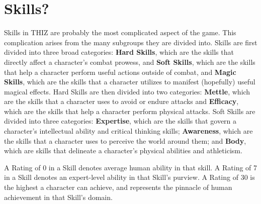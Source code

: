 \documentclass[oneside]{book}
\begin{document}
\section{Skills?}
Skills in THIZ are probably the most complicated aspect of the game. This complication arises from the many subgroups they are divided into. Skills are first divided into three broad categories: \textbf{Hard Skills}, which are the skills that directly affect a character's combat prowess, and \textbf{Soft Skills}, which are the skills that help a character perform useful actions outside of combat, and \textbf{Magic Skills}, which are the skills that a character utilizes to manifest (hopefully) useful magical effects. Hard Skills are then divided into two categories: \textbf{Mettle}, which are the skills that a character uses to avoid or endure attacks and \textbf{Efficacy}, which are the skills that help a character perform physical attacks. Soft Skills are divided into three categories: \textbf{Expertise}, which are the skills that govern a character's intellectual ability and critical thinking skills; \textbf{Awareness}, which are the skills that a character uses to perceive the world around them; and \textbf{Body}, which are skills that delineate a character's physical abilities and athleticism.

A Rating of 0 in a Skill denotes average human ability in that skill. A Rating of 7 in a Skill denotes an expert-level ability in that Skill's purview. A Rating of 30 is the highest a character can achieve, and represents the pinnacle of human achievement in that Skill's domain.
\end{document}
